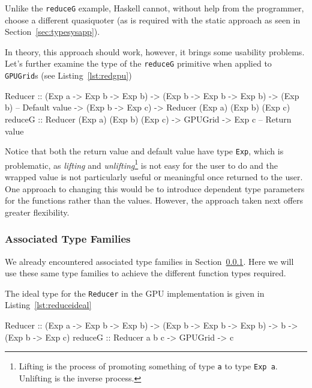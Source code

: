\documentclass[12pt,a4paper,twoside]{scrbook}
\begin{document}
Unlike the \texttt{reduceG} example, Haskell cannot, without help from the
programmer, choose a different quasiquoter (as is required with the static
approach as seen in Section~\ref{sec:typesysapp}).

In theory, this approach should work, however, it brings some usability
problems. Let's further examine the type of the \texttt{reduceG} primitive
when applied to \texttt{GPUGrid}s (see Listing~\ref{lst:redgpu})

\begin{hflisting}[label={lst:redgpu}, caption={The type of the reducer once the
    Accelerate types are applied.}]
Reducer :: (Exp a -> Exp b -> Exp b)
        -> (Exp b -> Exp b -> Exp b)
        -> (Exp b) -- Default value
        -> (Exp b -> Exp c)
        -> Reducer (Exp a) (Exp b) (Exp c)
reduceG :: Reducer (Exp a) (Exp b) (Exp c)
        -> GPUGrid
        -> Exp c -- Return value
\end{hflisting}

Notice that both the return value and default value have type \texttt{Exp},
which is problematic, as \emph{lifting} and \emph{unlifting}\footnote{Lifting is
  the process of promoting something of type \texttt{a} to type \texttt{Exp
    a}. Unlifting is the inverse process.}  is not easy for the user to do and
the wrapped value is not particularly useful or meaningful once returned to the
user. One approach to changing this would be to introduce dependent type
parameters for the functions rather than the values. However, the approach taken
next offers greater flexibility.

\subsubsection{Associated Type Families}
\label{sec:typefam}

We already encountered associated type families in
Section~\ref{sec:typefam}. Here we will use these same type families to achieve
the different function types required.

The ideal type for the \texttt{Reducer} in the GPU implementation is given in
Listing~\ref{lst:reduceideal}

\begin{hflisting}[label={lst:reduceideal}, caption={The optimal type for the
    reduce primitive under Accelerate.}]
Reducer :: (Exp a -> Exp b -> Exp b)
        -> (Exp b -> Exp b -> Exp b)
        -> b
        -> (Exp b -> Exp c)
reduceG :: Reducer a b c -> GPUGrid -> c
\end{hflisting}
\end{document}
